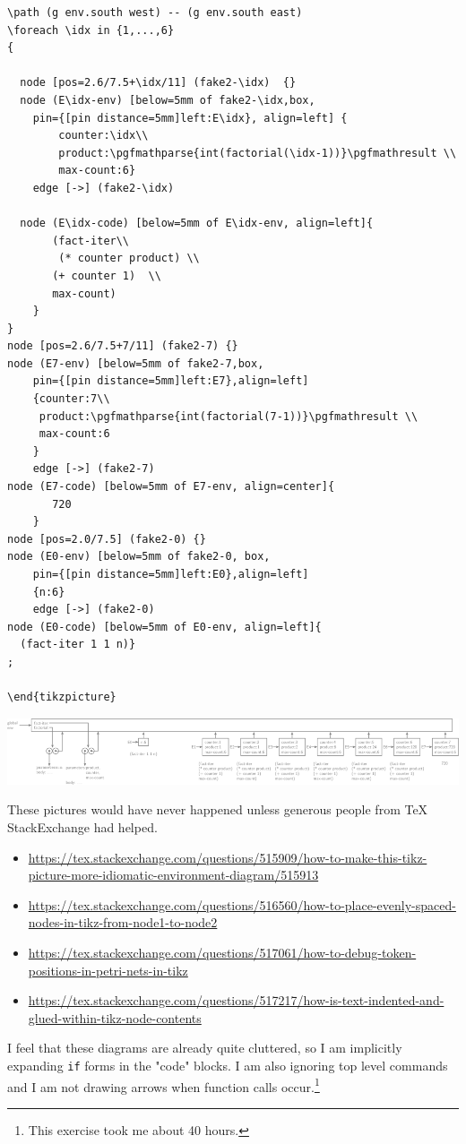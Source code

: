 \documentclass[a4paper,12pt,twoside]{report}
\begin{document}
\begin{lstlisting}
\path (g env.south west) -- (g env.south east)
\foreach \idx in {1,...,6}
{

  node [pos=2.6/7.5+\idx/11] (fake2-\idx)  {}
  node (E\idx-env) [below=5mm of fake2-\idx,box,
    pin={[pin distance=5mm]left:E\idx}, align=left] {
        counter:\idx\\
        product:\pgfmathparse{int(factorial(\idx-1))}\pgfmathresult \\
        max-count:6}
    edge [->] (fake2-\idx)

  node (E\idx-code) [below=5mm of E\idx-env, align=left]{
       (fact-iter\\
        (* counter product) \\
       (+ counter 1)  \\
       max-count)
    }
}
node [pos=2.6/7.5+7/11] (fake2-7) {}
node (E7-env) [below=5mm of fake2-7,box,
    pin={[pin distance=5mm]left:E7},align=left]
    {counter:7\\
     product:\pgfmathparse{int(factorial(7-1))}\pgfmathresult \\
     max-count:6
    }
    edge [->] (fake2-7)
node (E7-code) [below=5mm of E7-env, align=center]{
       720
    }
node [pos=2.0/7.5] (fake2-0) {}
node (E0-env) [below=5mm of fake2-0, box,
    pin={[pin distance=5mm]left:E0},align=left]
    {n:6}
    edge [->] (fake2-0)
node (E0-code) [below=5mm of E0-env, align=left]{
  (fact-iter 1 1 n)}
;

\end{tikzpicture}
\end{lstlisting}

\begin{center}
\includegraphics[width=.9\linewidth]{exercise-3-9-part-2.png}
\end{center}

These pictures would have never happened unless generous people from
\TeX{} StackExchange had helped.

\begin{itemize}
\item \url{https://tex.stackexchange.com/questions/515909/how-to-make-this-tikz-picture-more-idiomatic-environment-diagram/515913}
\item \url{https://tex.stackexchange.com/questions/516560/how-to-place-evenly-spaced-nodes-in-tikz-from-node1-to-node2}
\item \url{https://tex.stackexchange.com/questions/517061/how-to-debug-token-positions-in-petri-nets-in-tikz}
\item \url{https://tex.stackexchange.com/questions/517217/how-is-text-indented-and-glued-within-tikz-node-contents}
\end{itemize}

I feel that these diagrams are already quite cluttered, so I am
implicitly expanding \texttt{if} forms in the "code" blocks. I am also
ignoring top level commands and I am not drawing arrows when function
calls occur.\footnote{This exercise took me about 40 hours.}
\end{document}
